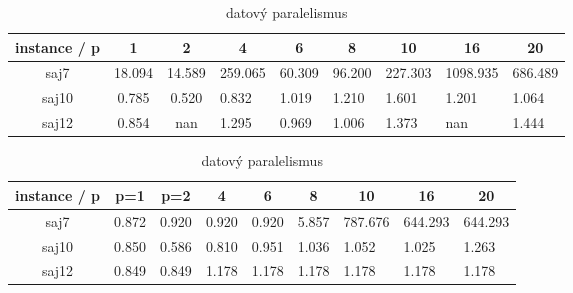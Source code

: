 \documentclass{article}
\begin{document}
    \begin{table}[h]
        \begin{subtable}{.5\linewidth}\centering
        \begin{tabular}{|c|c|c|l|l|l|l|l|l|}
            \hline
            \textbf{instance / p} &
            \textbf{1} &
            \textbf{2} &
            \multicolumn{1}{c|}{\textbf{4}} &
            \multicolumn{1}{c|}{\textbf{6}} &
            \multicolumn{1}{c|}{\textbf{8}} &
            \multicolumn{1}{c|}{\textbf{10}} &
            \multicolumn{1}{c|}{\textbf{16}} &
            \multicolumn{1}{c|}{\textbf{20}} \\ \hline
            saj7 &
                {\color[HTML]{FE0000} 18.094} &
                {\color[HTML]{FE0000} 14.589} &
                {\color[HTML]{FE0000} 259.065} &
                {\color[HTML]{FE0000} 60.309} &
                {\color[HTML]{FE0000} 96.200} &
                {\color[HTML]{FE0000} 227.303} &
                {\color[HTML]{FE0000} 1098.935} &
                {\color[HTML]{FE0000} 686.489} \\ \hline
            saj10 & 0.785 & 0.520 & 0.832 & 1.019 & 1.210 & 1.601 & 1.201 & 1.064 \\ \hline
            saj12 & 0.854 & nan   & 1.295 & 0.969 & 1.006 & 1.373 & nan   & 1.444 \\ \hline
        \end{tabular}
        \caption{taskový paralelismus} \label{tab:speedup-openmp-task}
        \end{subtable}%
        \bigskip
        \bigskip

        \begin{subtable}{.5\linewidth}\centering
        \begin{tabular}{|c|c|c|l|l|l|l|l|l|}
            \hline
            \textbf{instance / p} &
            \textbf{p=1} &
            \textbf{p=2} &
            \multicolumn{1}{c|}{\textbf{4}} &
            \multicolumn{1}{c|}{\textbf{6}} &
            \multicolumn{1}{c|}{\textbf{8}} &
            \multicolumn{1}{c|}{\textbf{10}} &
            \multicolumn{1}{c|}{\textbf{16}} &
            \multicolumn{1}{c|}{\textbf{20}} \\ \hline
            saj7  & 0.872 & 0.920 & 0.920 & 0.920 & 5.857 & {\color[HTML]{FE0000} 787.676} & {\color[HTML]{FE0000} 644.293} & {\color[HTML]{FE0000} 644.293} \\ \hline
            saj10 & 0.850 & 0.586 & 0.810 & 0.951 & 1.036 & 1.052                          & 1.025                          & 1.263                          \\ \hline
            saj12 & 0.849 & 0.849 & 1.178 & 1.178 & 1.178 & 1.178                          & 1.178                          & 1.178                          \\ \hline
        \end{tabular}
        \caption{datový paralelismus} \label{tab:speedup-openmp-data}
        \end{subtable}%
        \bigskip
        \bigskip


\end{table}
\end{document}

